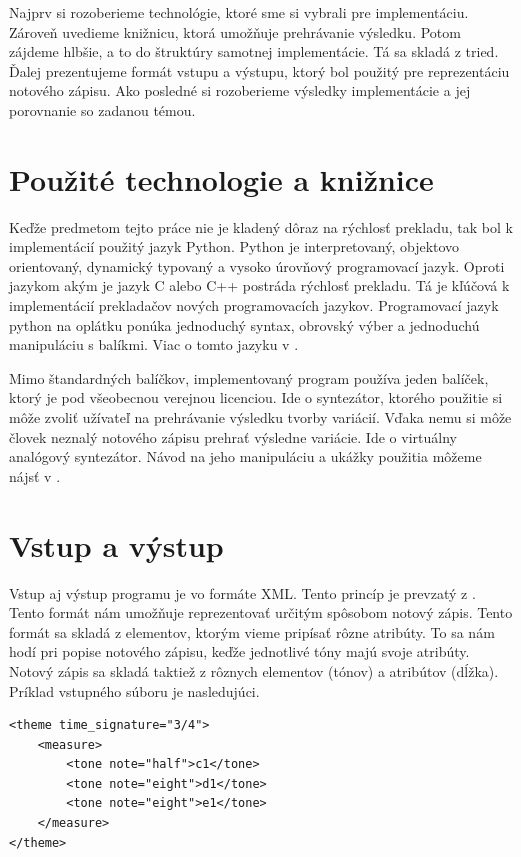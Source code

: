 Najprv si rozoberieme technológie, ktoré sme si vybrali pre implementáciu. Zároveň uvedieme knižnicu, ktorá umožňuje prehrávanie výsledku. Potom zájdeme hlbšie, a to do štruktúry samotnej implementácie. Tá sa skladá z tried. Ďalej prezentujeme formát vstupu a výstupu, ktorý bol použitý pre reprezentáciu notového zápisu. Ako posledné si rozoberieme výsledky implementácie a jej porovnanie so zadanou témou.

\section{Použité technologie a knižnice}
\label{technologies}
Keďže predmetom tejto práce nie je kladený dôraz na rýchlosť prekladu, tak bol k implementácií použitý jazyk Python. Python je interpretovaný, objektovo orientovaný, dynamický typovaný a vysoko úrovňový programovací jazyk. Oproti jazykom akým je jazyk C alebo C++ postráda rýchlosť prekladu. Tá je kľúčová k implementácií prekladačov nových programovacích jazykov. Programovací jazyk python na oplátku ponúka jednoduchý syntax, obrovský výber a jednoduchú manipuláciu s balíkmi. Viac o tomto jazyku v \cite{python:site}.

Mimo štandardných balíčkov, implementovaný program používa jeden balíček, ktorý je pod všeobecnou verejnou licenciou. Ide o syntezátor, ktorého použitie si môže zvoliť užívateľ na prehrávanie výsledku tvorby variácií. Vďaka nemu si môže človek neznalý notového zápisu prehrať výsledne variácie. Ide o virtuálny analógový syntezátor. Návod na jeho manipuláciu a ukážky použitia môžeme nájsť v \cite{synt:site}.

\section{Vstup a výstup}
\label{inputoutput}
Vstup aj výstup programu je vo formáte XML. Tento princíp je prevzatý z \cite{afrpub}. Tento formát nám umožňuje reprezentovať určitým spôsobom notový zápis. Tento formát sa skladá z elementov, ktorým vieme pripísať rôzne atribúty. To sa nám hodí pri popise notového zápisu, keďže jednotlivé tóny majú svoje atribúty. Notový zápis sa skladá taktiež z rôznych elementov (tónov) a atribútov (dĺžka). Príklad vstupného súboru je nasledujúci.
\newpage
\lstset{language=XML}
\begin{lstlisting}
<theme time_signature="3/4">
    <measure>
        <tone note="half">c1</tone>
        <tone note="eight">d1</tone>
        <tone note="eight">e1</tone>
    </measure>
</theme>
\end{lstlisting}

